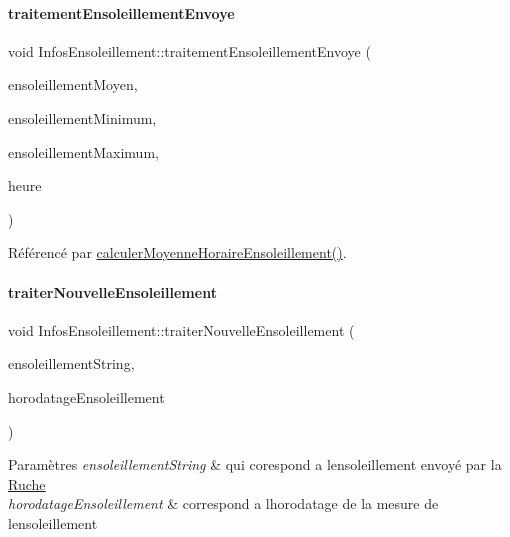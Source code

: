 \paragraph{\texorpdfstring{traitement\+Ensoleillement\+Envoye}{traitementEnsoleillementEnvoye}}
{\footnotesize\ttfamily void Infos\+Ensoleillement\+::traitement\+Ensoleillement\+Envoye (\begin{DoxyParamCaption}\item[{double}]{ensoleillement\+Moyen,  }\item[{double}]{ensoleillement\+Minimum,  }\item[{double}]{ensoleillement\+Maximum,  }\item[{int}]{heure }\end{DoxyParamCaption})\hspace{0.3cm}{\ttfamily [signal]}}



Référencé par \hyperlink{class_infos_ensoleillement_a43d0967a59887bf70071296fef0660d3}{calculer\+Moyenne\+Horaire\+Ensoleillement()}.

\mbox{\label{class_infos_ensoleillement_abe5426845614e3383e915dc9b3cacc3e}} 
\paragraph{\texorpdfstring{traiter\+Nouvelle\+Ensoleillement}{traiterNouvelleEnsoleillement}}
{\footnotesize\ttfamily void Infos\+Ensoleillement\+::traiter\+Nouvelle\+Ensoleillement (\begin{DoxyParamCaption}\item[{Q\+String}]{ensoleillement\+String,  }\item[{Q\+String}]{horodatage\+Ensoleillement }\end{DoxyParamCaption})\hspace{0.3cm}{\ttfamily [slot]}}


\begin{DoxyParams}{Paramètres}
{\em ensoleillement\+String} & qui corespond a l\textquotesingle{}ensoleillement envoyé par la \hyperlink{class_ruche}{Ruche} \\
\hline
{\em horodatage\+Ensoleillement} & correspond a l\textquotesingle{}horodatage de la mesure de l\textquotesingle{}ensoleillement \\
\hline
\end{DoxyParams}


